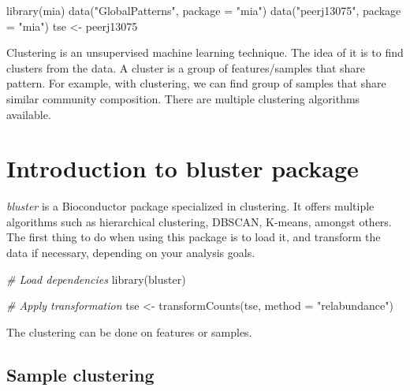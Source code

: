 \documentclass[
]{book}
\newenvironment{Shaded}{\begin{snugshade}}{\end{snugshade}}
\newcommand{\AttributeTok}[1]{\textcolor[rgb]{0.77,0.63,0.00}{#1}}
\newcommand{\CommentTok}[1]{\textcolor[rgb]{0.56,0.35,0.01}{\textit{#1}}}
\newcommand{\FunctionTok}[1]{\textcolor[rgb]{0.00,0.00,0.00}{#1}}
\newcommand{\NormalTok}[1]{#1}
\newcommand{\OtherTok}[1]{\textcolor[rgb]{0.56,0.35,0.01}{#1}}
\newcommand{\StringTok}[1]{\textcolor[rgb]{0.31,0.60,0.02}{#1}}
\begin{document}
\begin{Shaded}
\begin{Highlighting}[]
\FunctionTok{library}\NormalTok{(mia)}
\FunctionTok{data}\NormalTok{(}\StringTok{"GlobalPatterns"}\NormalTok{, }\AttributeTok{package =} \StringTok{"mia"}\NormalTok{)}
\FunctionTok{data}\NormalTok{(}\StringTok{"peerj13075"}\NormalTok{, }\AttributeTok{package =} \StringTok{"mia"}\NormalTok{)}
\NormalTok{tse }\OtherTok{\textless{}{-}}\NormalTok{ peerj13075}
\end{Highlighting}
\end{Shaded}

Clustering is an unsupervised machine learning technique. The idea of
it is to find clusters from the data. A cluster is a group of
features/samples that share pattern. For example, with clustering, we
can find group of samples that share similar community
composition. There are multiple clustering algorithms available.

\hypertarget{introduction-to-bluster-package}{%
\section{Introduction to bluster package}\label{introduction-to-bluster-package}}

\emph{bluster} is a Bioconductor package specialized in clustering. It offers
multiple algorithms such as hierarchical clustering, DBSCAN, K-means,
amongst others. The first thing to do when using this package is to load
it, and transform the data if necessary, depending on your analysis goals.

\begin{Shaded}
\begin{Highlighting}[]
\CommentTok{\# Load dependencies}
\FunctionTok{library}\NormalTok{(bluster)}

\CommentTok{\# Apply transformation}
\NormalTok{tse }\OtherTok{\textless{}{-}} \FunctionTok{transformCounts}\NormalTok{(tse, }\AttributeTok{method =} \StringTok{"relabundance"}\NormalTok{)}
\end{Highlighting}
\end{Shaded}

The clustering can be done on features or samples.

\hypertarget{sample-clustering}{%
\subsection{Sample clustering}\label{sample-clustering}}
\end{document}
